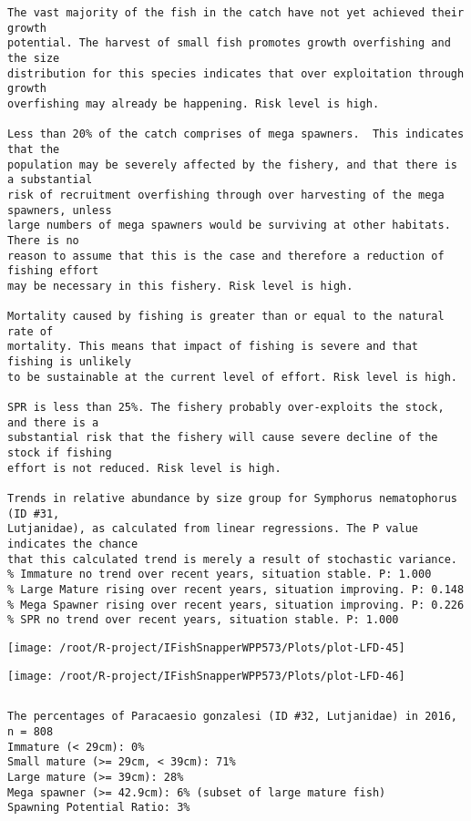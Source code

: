 \documentclass{report}\usepackage[]{graphicx}\usepackage[]{color}
\makeatletter
\def\maxwidth{ %
  \ifdim\Gin@nat@width>\linewidth
    \linewidth
  \else
    \Gin@nat@width
  \fi
}
\newenvironment{kframe}{%
 \def\at@end@of@kframe{}%
 \ifinner\ifhmode%
  \def\at@end@of@kframe{\end{minipage}}%
  \begin{minipage}{\columnwidth}%
 \fi\fi%
 \def\FrameCommand##1{\hskip\@totalleftmargin \hskip-\fboxsep
 \colorbox{shadecolor}{##1}\hskip-\fboxsep
     \hskip-\linewidth \hskip-\@totalleftmargin \hskip\columnwidth}%
 \MakeFramed {\advance\hsize-\width
   \@totalleftmargin\z@ \linewidth\hsize
   \@setminipage}}%
 {\par\unskip\endMakeFramed%
 \at@end@of@kframe}
\newenvironment{knitrout}{}{} %
\makeatother
\begin{document}
\begin{knitrout}
\begin{kframe}
\begin{verbatim}
The vast majority of the fish in the catch have not yet achieved their growth
potential. The harvest of small fish promotes growth overfishing and the size
distribution for this species indicates that over exploitation through growth
overfishing may already be happening. Risk level is high.

Less than 20% of the catch comprises of mega spawners.  This indicates that the
population may be severely affected by the fishery, and that there is a substantial
risk of recruitment overfishing through over harvesting of the mega spawners, unless
large numbers of mega spawners would be surviving at other habitats. There is no
reason to assume that this is the case and therefore a reduction of fishing effort
may be necessary in this fishery. Risk level is high.
 
Mortality caused by fishing is greater than or equal to the natural rate of
mortality. This means that impact of fishing is severe and that fishing is unlikely
to be sustainable at the current level of effort. Risk level is high.
 
SPR is less than 25%. The fishery probably over-exploits the stock, and there is a
substantial risk that the fishery will cause severe decline of the stock if fishing
effort is not reduced. Risk level is high.
 
Trends in relative abundance by size group for Symphorus nematophorus (ID #31,
Lutjanidae), as calculated from linear regressions. The P value indicates the chance
that this calculated trend is merely a result of stochastic variance.
% Immature no trend over recent years, situation stable. P: 1.000
% Large Mature rising over recent years, situation improving. P: 0.148
% Mega Spawner rising over recent years, situation improving. P: 0.226
% SPR no trend over recent years, situation stable. P: 1.000
\end{verbatim}
\end{kframe}
\texttt{[image: /root/R-project/IFishSnapperWPP573/Plots/plot-LFD-45]} 

\texttt{[image: /root/R-project/IFishSnapperWPP573/Plots/plot-LFD-46]} 
\begin{kframe}\begin{verbatim}
\end{verbatim}
\end{kframe}
\clearpage
\newpage
\begin{kframe}\begin{verbatim}The percentages of Paracaesio gonzalesi (ID #32, Lutjanidae) in 2016, n = 808
Immature (< 29cm): 0%
Small mature (>= 29cm, < 39cm): 71%
Large mature (>= 39cm): 28%
Mega spawner (>= 42.9cm): 6% (subset of large mature fish)
Spawning Potential Ratio: 3%
 

\end{verbatim}
\end{kframe}
\end{knitrout}
\end{document}
